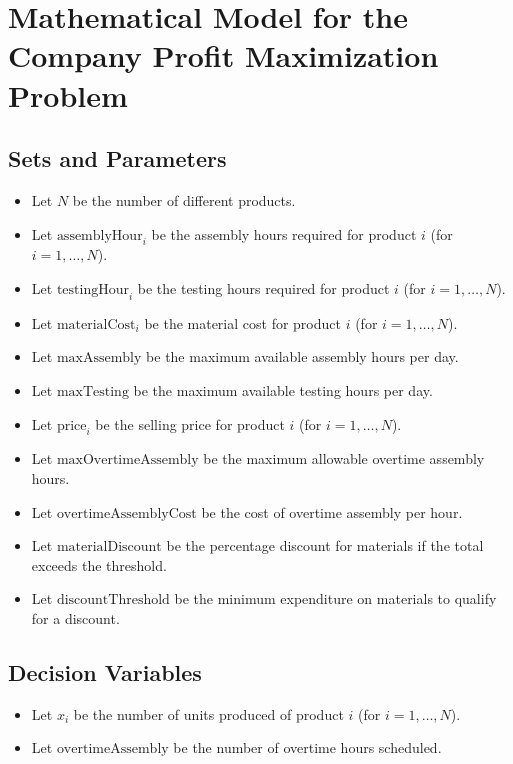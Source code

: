 \documentclass{article}
\begin{document}
\section*{Mathematical Model for the Company Profit Maximization Problem}

\subsection*{Sets and Parameters}
\begin{itemize}
    \item Let \( N \) be the number of different products.
    \item Let \( \text{assemblyHour}_i \) be the assembly hours required for product \( i \) (for \( i = 1, \ldots, N \)).
    \item Let \( \text{testingHour}_i \) be the testing hours required for product \( i \) (for \( i = 1, \ldots, N \)).
    \item Let \( \text{materialCost}_i \) be the material cost for product \( i \) (for \( i = 1, \ldots, N \)).
    \item Let \( \text{maxAssembly} \) be the maximum available assembly hours per day.
    \item Let \( \text{maxTesting} \) be the maximum available testing hours per day.
    \item Let \( \text{price}_i \) be the selling price for product \( i \) (for \( i = 1, \ldots, N \)).
    \item Let \( \text{maxOvertimeAssembly} \) be the maximum allowable overtime assembly hours.
    \item Let \( \text{overtimeAssemblyCost} \) be the cost of overtime assembly per hour.
    \item Let \( \text{materialDiscount} \) be the percentage discount for materials if the total exceeds the threshold.
    \item Let \( \text{discountThreshold} \) be the minimum expenditure on materials to qualify for a discount.
\end{itemize}

\subsection*{Decision Variables}
\begin{itemize}
    \item Let \( x_i \) be the number of units produced of product \( i \) (for \( i = 1, \ldots, N \)).
    \item Let \( \text{overtimeAssembly} \) be the number of overtime hours scheduled.
\end{itemize}
\end{document}
